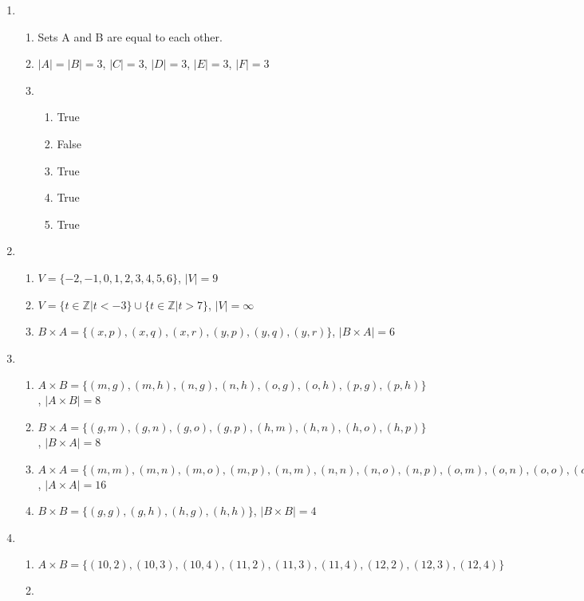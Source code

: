 \documentclass{article}
\begin{document}
\begin{enumerate}
    \item 
    \begin{enumerate}
        \item Sets A and B are equal to each other.
        \item $|A| = |B| = 3$, $|C| = 3$, $|D| = 3$, $|E| = 3$, $|F| = 3$
        \item 
        \begin{enumerate}
            \item True
            \item False
            \item True
            \item True
            \item True
        \end{enumerate}
    \end{enumerate}
    \item 
    \begin{enumerate}
        \item $V = \{-2, -1, 0, 1, 2, 3, 4, 5, 6\}$, $|V| = 9$
        \item $V = \{t \in \mathbb{Z} | t < -3\} \cup \{t \in \mathbb{Z} | t > 7\}$, $|V| = \infty$
        \item $B \times A = \{(x, p), (x, q), (x, r), (y, p), (y, q), (y, r)\}$, $|B \times A| = 6$
    \end{enumerate}
    \item 
    \begin{enumerate}
        \item $A \times B = \{(m, g), (m, h), (n, g), (n, h), (o, g), (o, h), (p, g), (p, h)\}$, $|A \times B| = 8$
        \item $B \times A = \{(g, m), (g, n), (g, o), (g, p), (h, m), (h, n), (h, o), (h, p)\}$, $|B \times A| = 8$
        \item $A \times A = \{(m, m), (m, n), (m, o), (m, p), (n, m), (n, n), (n, o), (n, p), (o, m), (o, n), (o, o), (o, p), (p, m), (p, n), (p, o), (p, p)\}$, $|A \times A| = 16$
        \item $B \times B = \{(g, g), (g, h), (h, g), (h, h)\}$, $|B \times B| = 4$
    \end{enumerate}
    \item 
    \begin{enumerate}
        \item $A \times B = \{(10, 2), (10, 3), (10, 4), (11, 2), (11, 3), (11, 4), (12, 2), (12, 3), (12, 4)\}$
        \item 

\end{enumerate}
\end{enumerate}
\end{document}
